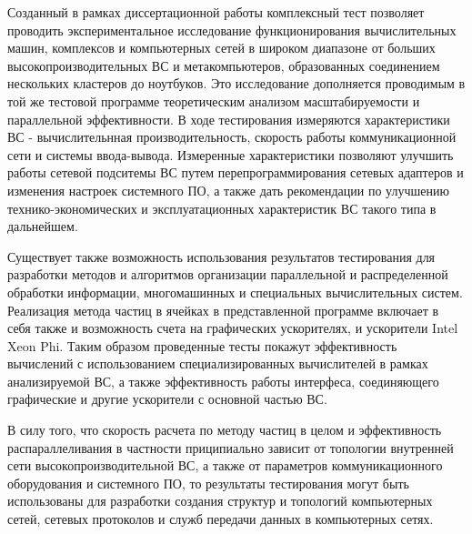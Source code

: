 Созданный в рамках диссертационной работы комплексный тест позволяет проводить экспериментальное исследование функционирования вычислительных машин, комплексов и компьютерных сетей в широком диапазоне от больших высокопроизводительных ВС и метакомпьютеров, образованных соединением нескольких кластеров до ноутбуков. Это исследование дополняется проводимым в той же тестовой программе теоретическим анализом масштабируемости и параллельной эффективности. В ходе тестирования измеряются характеристики ВС - вычислительнная производительность, скорость работы коммуникационной сети и системы ввода-вывода. Измеренные характеристики позволяют улучшить работы сетевой подситемы ВС путем перепрограммирования сетевых адаптеров и изменения настроек системного ПО, а также дать рекомендации по улучшению технико-экономических и эксплуатационных характеристик ВС такого типа в дальнейшем.


Существует также возможность использования результатов тестирования для разработки методов и алгоритмов организации параллельной и распределенной обработки информации, многомашинных и специальных вычислительных систем. Реализация
метода частиц в ячейках в представленной программе включает в себя также и возможность счета на графических ускорителях, и ускорители Intel Xeon Phi. Таким образом проведенные тесты покажут эффективность вычислений с использованием специализированных вычислителей в рамках анализируемой ВС, а также эффективность работы интерфеса, соединяющего графические и другие ускорители с основной частью ВС.

В силу того, что скорость расчета по методу частиц в целом и эффективность распараллеливания в частности приципиально зависит от топологии внутренней сети высокопроизводительной ВС, а также от параметров коммуникационного оборудования и системного ПО, то результаты тестирования могут быть использованы для разработки создания структур и топологий компьютерных сетей, сетевых протоколов и служб передачи данных в компьютерных сетях.

